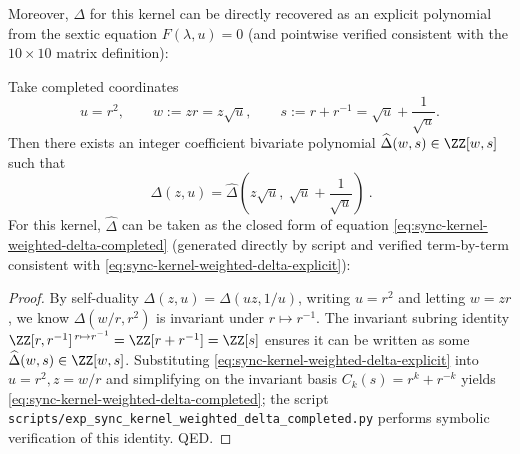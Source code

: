 Moreover, \(\Delta\) for this kernel can be directly recovered as an explicit polynomial from the sextic equation \(F(\lambda,u)=0\) (and pointwise verified consistent with the \(10\times 10\) matrix definition):

\begin{proposition}[Completed Determinant Bivariate Closed Form: \texorpdfstring{$\Delta(z,u)=\widehat\Delta(w,s)$}{Delta=hatDelta}]\label{prop:sync-kernel-weighted-hat-delta}
Take completed coordinates
\[
u=r^2,\qquad w:=zr=z\sqrt{u},\qquad s:=r+r^{-1}=\sqrt{u}+\frac{1}{\sqrt{u}}.
\]
Then there exists an integer coefficient bivariate polynomial \(\widehat\Delta(w,s)\in\ZZ[w,s]\) such that
\[
\boxed{\ \Delta(z,u)=\widehat\Delta\!\left(z\sqrt{u},\ \sqrt{u}+\frac{1}{\sqrt{u}}\right)\ }.
\]
For this kernel, \(\widehat\Delta\) can be taken as the closed form of equation \eqref{eq:sync-kernel-weighted-delta-completed} (generated directly by script and verified term-by-term consistent with \eqref{eq:sync-kernel-weighted-delta-explicit}):

\end{proposition}
\begin{proof}
By self-duality \(\Delta(z,u)=\Delta(uz,1/u)\), writing \(u=r^2\) and letting \(w=zr\), we know
\(
\Delta(w/r,r^2)
\)
is invariant under \(r\mapsto r^{-1}\).
The invariant subring identity
\(
\ZZ[r,r^{-1}]^{\,r\mapsto r^{-1}}=\ZZ[r+r^{-1}]=\ZZ[s]
\)
ensures it can be written as some \(\widehat\Delta(w,s)\in\ZZ[w,s]\).
Substituting \eqref{eq:sync-kernel-weighted-delta-explicit} into \(u=r^2,z=w/r\) and simplifying on the invariant basis \(C_k(s)=r^k+r^{-k}\) yields \eqref{eq:sync-kernel-weighted-delta-completed}; the script \texttt{scripts/exp\_sync\_kernel\_weighted\_delta\_completed.py} performs symbolic verification of this identity. QED.
\end{proof}

